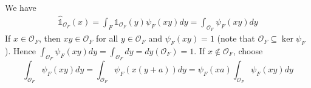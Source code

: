 \begin{problem} \notfinish
\end{problem}

\begin{problem} \notfinish
\end{problem}

\begin{problem} \notfinish
\end{problem}

\begin{problem} \notfinish
\end{problem}

\begin{problem} \notfinish
We have
\begin{align*}
    \hat{\mathds{1}}_{\mathcal{O}_F}(x) = \int_F \mathds{1}_{\mathcal{O}_F}(y) \psi_F(xy) dy = \int_{\mathcal{O}_F} \psi_F(xy) dy
\end{align*}
If $x \in \mathcal{O}_F$, then $xy \in \mathcal{O}_F$  for all $y \in \mathcal{O}_F$ and $\psi_F(xy) = 1$
(note that $\mathcal{O}_F \subseteq \ker \psi_F$). Hence
$\int_{\mathcal{O}_F}\psi_F(xy)dy = \int_{\mathcal{O}_F} dy = dy(\mathcal{O}_F) = 1$.
If $x \not \in \mathcal{O}_F$, choose 
$$
\int_{\mathcal{O}_F} \psi_F(xy)dy= \int_{\mathcal{O}_F} \psi_F(x(y + a)) dy = \psi_F(xa) \int_{\mathcal{O}_F}\psi_F(xy) dy
$$
\end{problem}
